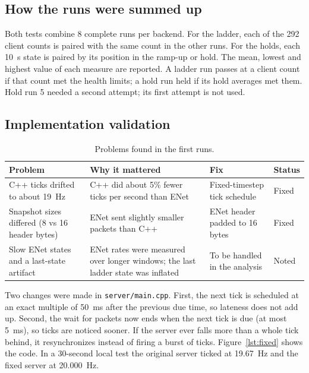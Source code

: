 \documentclass[11pt]{article}
\begin{document}
\subsection{How the runs were summed up}
Both tests combine 8 complete runs per backend. For the ladder, each of the 292 client counts is paired with the same count in the other runs. For the holds, each 10~s state is paired by its position in the ramp-up or hold. The mean, lowest and highest value of each measure are reported. A ladder run passes at a client count if that count met the health limits; a hold run held if its hold averages met them. Hold run 5 needed a second attempt; its first attempt is not used.

\subsection{Implementation validation}\label{sec:fixes}
\begin{table}[H]
\centering
\footnotesize
\setlength{\tabcolsep}{3pt}
\begin{tabular}{p{}p{}p{}p{}}
\toprule
Problem & Why it mattered & Fix & Status \\
\midrule
C++ ticks drifted to about 19~Hz & C++ did about 5\% fewer ticks per second than ENet & Fixed-timestep tick schedule & Fixed \\
Snapshot sizes differed (8 vs 16 header bytes) & ENet sent slightly smaller packets than C++ & ENet header padded to 16 bytes & Fixed \\
Slow ENet states and a last-state artifact & ENet rates were measured over longer windows; the last ladder state was inflated & To be handled in the analysis & Noted \\
\bottomrule
\end{tabular}
\caption{Problems found in the first runs.}
\label{tab:problems}
\end{table}

Two changes were made in \texttt{server/main.cpp}. First, the next tick is scheduled at an exact multiple of 50~ms after the previous due time, so lateness does not add up. Second, the wait for packets now ends when the next tick is due (at most 5~ms), so ticks are noticed sooner. If the server ever falls more than a whole tick behind, it resynchronizes instead of firing a burst of ticks. Figure~\ref{lst:fixed} shows the code. In a 30-second local test the original server ticked at 19.67~Hz and the fixed server at 20.000~Hz.
\end{document}
